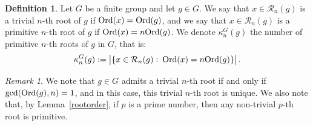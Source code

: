 \documentclass[12pt]{amsart}
\numberwithin{equation}{section}
\newcommand{\Ord}{{\rm Ord}}
\theoremstyle{definition}
\newtheorem{defi}[X]{Definition}
\theoremstyle{remark}
\newtheorem{rk}{Remark}[section]
\begin{document}
\begin{defi}\label{def:primitiveroots}
    Let $G$ be a finite group and let $g\in G$. We say that $x\in \mathcal{R}_n(g)$ is a trivial $n$-th root of $g$ if $\Ord(x)=\Ord(g)$, and we say that $x\in \mathcal{R}_n(g)$ is a primitive $n$-th root of $g$ if $\Ord(x)=n\Ord(g)$. We denote $\kappa_n^G(g)$ the number of primitive $n$-th roots of $g$ in $G$, that is: 
    \[\kappa_n^G(g):=\bigl| \{ x\in \mathcal{R}_n(g)\, \colon\, \Ord(x)=n\Ord(g)\}\bigr|\, .\]
\end{defi}
\begin{rk}\label{trivialroot}
    We note that $g\in G$ admits a trivial $n$-th root if and only if $\gcd(\Ord(g),n)=1$, and in this case, this trivial $n$-th root is unique. We also note that, by Lemma~\ref{rootorder}, if $p$ is a prime number, then any non-trivial $p$-th root is primitive. 
\end{rk}
 
\end{document}

